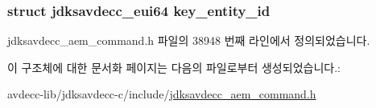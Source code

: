 \subsubsection[{\texorpdfstring{key\+\_\+entity\+\_\+id}{key_entity_id}}]{\setlength{\rightskip}{0pt plus 5cm}struct {\bf jdksavdecc\+\_\+eui64} key\+\_\+entity\+\_\+id}\hypertarget{structjdksavdecc__aem__command__auth__get__identity__response_a1d00b892b0a7ee20cc6db265b49c322b}{}\label{structjdksavdecc__aem__command__auth__get__identity__response_a1d00b892b0a7ee20cc6db265b49c322b}


jdksavdecc\+\_\+aem\+\_\+command.\+h 파일의 38948 번째 라인에서 정의되었습니다.



이 구조체에 대한 문서화 페이지는 다음의 파일로부터 생성되었습니다.\+:\begin{DoxyCompactItemize}
\item 
avdecc-\/lib/jdksavdecc-\/c/include/\hyperlink{jdksavdecc__aem__command_8h}{jdksavdecc\+\_\+aem\+\_\+command.\+h}\end{DoxyCompactItemize}
